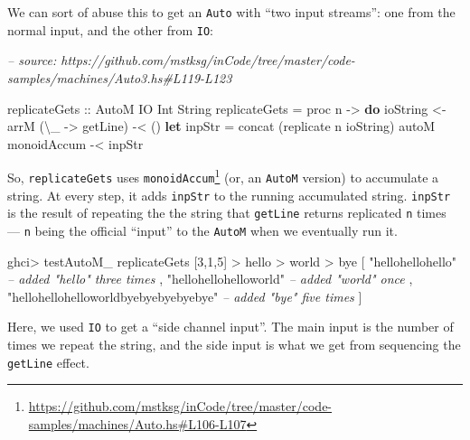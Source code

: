 \documentclass[]{article}
\newenvironment{Shaded}{}{}
\newcommand{\CommentTok}[1]{\textcolor[rgb]{0.38,0.63,0.69}{\textit{#1}}}
\newcommand{\DataTypeTok}[1]{\textcolor[rgb]{0.56,0.13,0.00}{#1}}
\newcommand{\DecValTok}[1]{\textcolor[rgb]{0.25,0.63,0.44}{#1}}
\newcommand{\FunctionTok}[1]{\textcolor[rgb]{0.02,0.16,0.49}{#1}}
\newcommand{\KeywordTok}[1]{\textcolor[rgb]{0.00,0.44,0.13}{\textbf{#1}}}
\newcommand{\NormalTok}[1]{#1}
\newcommand{\OtherTok}[1]{\textcolor[rgb]{0.00,0.44,0.13}{#1}}
\newcommand{\StringTok}[1]{\textcolor[rgb]{0.25,0.44,0.63}{#1}}
\renewcommand{\href}[2]{#2\footnote{\url{#1}}}
\begin{document}
We can sort of abuse this to get an \texttt{Auto} with ``two input streams'':
one from the normal input, and the other from \texttt{IO}:

\begin{Shaded}
\begin{Highlighting}[]
\CommentTok{-- source: https://github.com/mstksg/inCode/tree/master/code-samples/machines/Auto3.hs#L119-L123}

\OtherTok{replicateGets ::} \DataTypeTok{AutoM} \DataTypeTok{IO} \DataTypeTok{Int} \DataTypeTok{String}
\NormalTok{replicateGets }\FunctionTok{=}\NormalTok{ proc n }\OtherTok{->} \KeywordTok{do}
\NormalTok{    ioString }\OtherTok{<-}\NormalTok{ arrM (\textbackslash{}_ }\OtherTok{->}\NormalTok{ getLine) }\FunctionTok{-<}\NormalTok{ ()}
    \KeywordTok{let}\NormalTok{ inpStr }\FunctionTok{=}\NormalTok{ concat (replicate n ioString)}
\NormalTok{    autoM monoidAccum }\FunctionTok{-<}\NormalTok{ inpStr}
\end{Highlighting}
\end{Shaded}

So, \texttt{replicateGets} uses
\href{https://github.com/mstksg/inCode/tree/master/code-samples/machines/Auto.hs\#L106-L107}{\texttt{monoidAccum}}
(or, an \texttt{AutoM} version) to accumulate a string. At every step, it adds
\texttt{inpStr} to the running accumulated string. \texttt{inpStr} is the result
of repeating the the string that \texttt{getLine} returns replicated \texttt{n}
times --- \texttt{n} being the official ``input'' to the \texttt{AutoM} when we
eventually run it.

\begin{Shaded}
\begin{Highlighting}[]
\NormalTok{ghci}\FunctionTok{>}\NormalTok{ testAutoM_ replicateGets [}\DecValTok{3}\NormalTok{,}\DecValTok{1}\NormalTok{,}\DecValTok{5}\NormalTok{]}
\FunctionTok{>}\NormalTok{ hello}
\FunctionTok{>}\NormalTok{ world}
\FunctionTok{>}\NormalTok{ bye}
\NormalTok{[ }\StringTok{"hellohellohello"}         \CommentTok{-- added "hello" three times}
\NormalTok{, }\StringTok{"hellohellohelloworld"}    \CommentTok{-- added "world" once}
\NormalTok{, }\StringTok{"hellohellohelloworldbyebyebyebyebye"}     \CommentTok{-- added "bye" five times}
\NormalTok{]}
\end{Highlighting}
\end{Shaded}

Here, we used \texttt{IO} to get a ``side channel input''. The main input is the
number of times we repeat the string, and the side input is what we get from
sequencing the \texttt{getLine} effect.
\end{document}
